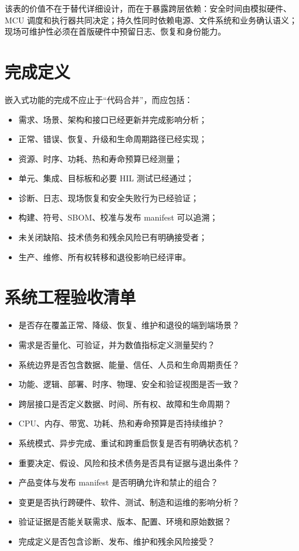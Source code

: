 该表的价值不在于替代详细设计，而在于暴露跨层依赖：安全时间由模拟硬件、MCU 调度和执行器共同决定；持久性同时依赖电源、文件系统和业务确认语义；现场可维护性必须在首版硬件中预留日志、恢复和身份能力。

\section{完成定义}

嵌入式功能的完成不应止于“代码合并”，而应包括：

\begin{itemize}
  \item 需求、场景、架构和接口已经更新并完成影响分析；
  \item 正常、错误、恢复、升级和生命周期路径已经实现；
  \item 资源、时序、功耗、热和寿命预算已经测量；
  \item 单元、集成、目标板和必要 HIL 测试已经通过；
  \item 诊断、日志、现场恢复和安全失败行为已经验证；
  \item 构建、符号、SBOM、校准与发布 manifest 可以追溯；
  \item 未关闭缺陷、技术债务和残余风险已有明确接受者；
  \item 生产、维修、所有权转移和退役影响已经评审。
\end{itemize}

\section{系统工程验收清单}

\begin{itemize}
  \item 是否存在覆盖正常、降级、恢复、维护和退役的端到端场景？
  \item 需求是否量化、可验证，并为数值指标定义测量契约？
  \item 系统边界是否包含数据、能量、信任、人员和生命周期责任？
  \item 功能、逻辑、部署、时序、物理、安全和验证视图是否一致？
  \item 跨层接口是否定义数据、时间、所有权、故障和生命周期？
  \item CPU、内存、带宽、功耗、热和寿命预算是否持续维护？
  \item 系统模式、异步完成、重试和跨重启恢复是否有明确状态机？
  \item 重要决定、假设、风险和技术债务是否具有证据与退出条件？
  \item 产品变体与发布 manifest 是否明确允许和禁止的组合？
  \item 变更是否执行跨硬件、软件、测试、制造和运维的影响分析？
  \item 验证证据是否能关联需求、版本、配置、环境和原始数据？
  \item 完成定义是否包含诊断、发布、维护和残余风险接受？
\end{itemize}
